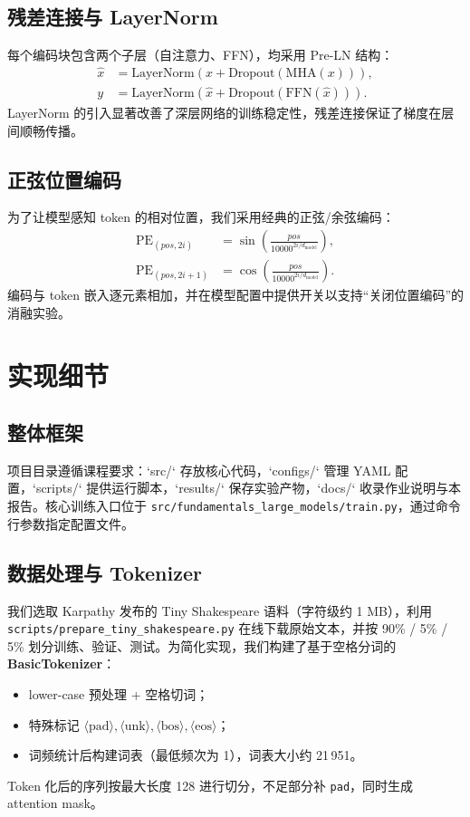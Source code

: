 \documentclass[12pt,a4paper]{article}
\begin{document}
\subsection{残差连接与 LayerNorm}
每个编码块包含两个子层（自注意力、FFN），均采用 Pre-LN 结构：
\begin{equation}
\begin{aligned}
    \hat{x} &= \mathrm{LayerNorm}(x + \mathrm{Dropout}(\mathrm{MHA}(x))),\\
    y &= \mathrm{LayerNorm}(\hat{x} + \mathrm{Dropout}(\mathrm{FFN}(\hat{x}))).
\end{aligned}
\end{equation}
LayerNorm 的引入显著改善了深层网络的训练稳定性，残差连接保证了梯度在层间顺畅传播。

\subsection{正弦位置编码}
为了让模型感知 token 的相对位置，我们采用经典的正弦/余弦编码：
\begin{equation}
\begin{aligned}
    \mathrm{PE}_{(pos, 2i)} &= \sin \left(\frac{pos}{10000^{2i/d_{\text{model}}}}\right), \\
    \mathrm{PE}_{(pos, 2i+1)} &= \cos \left(\frac{pos}{10000^{2i/d_{\text{model}}}}\right).
\end{aligned}
\end{equation}
编码与 token 嵌入逐元素相加，并在模型配置中提供开关以支持“关闭位置编码”的消融实验。

\section{实现细节}
\subsection{整体框架}
项目目录遵循课程要求：`src/` 存放核心代码，`configs/` 管理 YAML 配置，`scripts/` 提供运行脚本，`results/` 保存实验产物，`docs/` 收录作业说明与本报告。核心训练入口位于 \texttt{src/fundamentals\_large\_models/train.py}，通过命令行参数指定配置文件。

\subsection{数据处理与 Tokenizer}
我们选取 Karpathy 发布的 Tiny Shakespeare 语料（字符级约 1 MB），利用 \texttt{scripts/prepare\_tiny\_shakespeare.py} 在线下载原始文本，并按 90\% / 5\% / 5\% 划分训练、验证、测试。为简化实现，我们构建了基于空格分词的 \textbf{BasicTokenizer}：
\begin{itemize}
    \item lower-case 预处理 + 空格切词；
    \item 特殊标记 $\langle\text{pad}\rangle,\langle\text{unk}\rangle,\langle\text{bos}\rangle,\langle\text{eos}\rangle$；
    \item 词频统计后构建词表（最低频次为 1），词表大小约 21\,951。
\end{itemize}
Token 化后的序列按最大长度 128 进行切分，不足部分补 \texttt{pad}，同时生成 attention mask。
\end{document}
